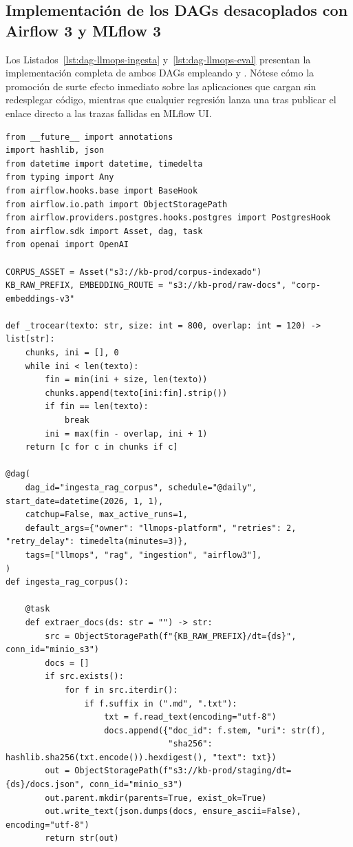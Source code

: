 \subsection{Implementación de los DAGs desacoplados con Airflow 3 y MLflow 3}

Los Listados~\ref{lst:dag-llmops-ingesta} y~\ref{lst:dag-llmops-eval} presentan la implementación completa de ambos DAGs empleando  y . Nótese cómo la promoción de  surte efecto inmediato sobre las aplicaciones que cargan  sin redesplegar código, mientras que cualquier regresión lanza una  tras publicar el enlace directo a las trazas fallidas en MLflow UI.

\begin{lstlisting}[style=python, basicstyle=\ttfamily\scriptsize\color{CodeIdentifier}, caption={DAG 1 (\code{ingesta\_rag\_corpus}): ingesta incremental, \textit{embeddings} y \textit{upsert} idempotente en \code{pgvector} emitiendo un \code{Asset} de Airflow~3.}, label={lst:dag-llmops-ingesta}]
from __future__ import annotations
import hashlib, json
from datetime import datetime, timedelta
from typing import Any
from airflow.hooks.base import BaseHook
from airflow.io.path import ObjectStoragePath
from airflow.providers.postgres.hooks.postgres import PostgresHook
from airflow.sdk import Asset, dag, task
from openai import OpenAI

CORPUS_ASSET = Asset("s3://kb-prod/corpus-indexado")
KB_RAW_PREFIX, EMBEDDING_ROUTE = "s3://kb-prod/raw-docs", "corp-embeddings-v3"

def _trocear(texto: str, size: int = 800, overlap: int = 120) -> list[str]:
    chunks, ini = [], 0
    while ini < len(texto):
        fin = min(ini + size, len(texto))
        chunks.append(texto[ini:fin].strip())
        if fin == len(texto):
            break
        ini = max(fin - overlap, ini + 1)
    return [c for c in chunks if c]

@dag(
    dag_id="ingesta_rag_corpus", schedule="@daily", start_date=datetime(2026, 1, 1),
    catchup=False, max_active_runs=1,
    default_args={"owner": "llmops-platform", "retries": 2, "retry_delay": timedelta(minutes=3)},
    tags=["llmops", "rag", "ingestion", "airflow3"],
)
def ingesta_rag_corpus():

    @task
    def extraer_docs(ds: str = "") -> str:
        src = ObjectStoragePath(f"{KB_RAW_PREFIX}/dt={ds}", conn_id="minio_s3")
        docs = []
        if src.exists():
            for f in src.iterdir():
                if f.suffix in (".md", ".txt"):
                    txt = f.read_text(encoding="utf-8")
                    docs.append({"doc_id": f.stem, "uri": str(f),
                                 "sha256": hashlib.sha256(txt.encode()).hexdigest(), "text": txt})
        out = ObjectStoragePath(f"s3://kb-prod/staging/dt={ds}/docs.json", conn_id="minio_s3")
        out.parent.mkdir(parents=True, exist_ok=True)
        out.write_text(json.dumps(docs, ensure_ascii=False), encoding="utf-8")
        return str(out)


\end{lstlisting}
